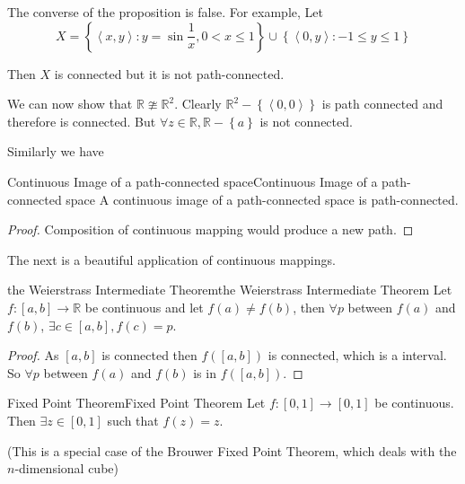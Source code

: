 \documentclass[../main.tex]{subfiles}
\begin{document}
\begin{remark}
The converse of the proposition is false. For example, Let
\begin{equation*}
X = \left\{ \left<x,y\right>: y=\sin \frac{1}{x}, 0<x\leq 1 \right\}\cup \left\{ \left<0,y\right>: -1\leq y\leq 1 \right\}
\end{equation*}

Then $X$ is connected but it is not path-connected.
\end{remark}

We can now show that $\mathbb{R}\ncong \mathbb{R}^2$. Clearly $\mathbb{R}^2 - \left\{ \left<0,0\right> \right\}$ is path connected and therefore is connected. But $\forall z\in \mathbb{R}, \mathbb{R}-\left\{ a \right\}$ is not connected.

Similarly we have
\begin{theorem}{Continuous Image of a path-connected space}{Continuous Image of a path-connected space}
A continuous image of a path-connected space is path-connected.
\end{theorem}
\begin{proof}
Composition of continuous mapping would produce a new path.
\end{proof}

The next is a beautiful application of continuous mappings.
\begin{theorem}{the Weierstrass Intermediate Theorem}{the Weierstrass Intermediate Theorem}
	Let $f:[a,b] \rightarrow \mathbb{R}$ be continuous and let $f(a)\neq f(b)$, then $\forall p$ between $f(a)$ and $f(b)$, $\exists c\in [a,b],f(c)=p$.
\end{theorem}
\begin{proof}
	As $[a,b]$ is connected then $f([a,b])$ is connected, which is a interval. So $\forall p$ between $f(a)$ and $f(b)$ is in $f([a,b])$.
\end{proof}

\begin{corollary}{Fixed Point Theorem}{Fixed Point Theorem}
	Let $f:[0,1]\rightarrow [0,1]$ be continuous. Then $\exists z\in [0,1]$ such that $f(z)=z$.

	(This is a special case of the Brouwer Fixed Point Theorem, which deals with the $n$-dimensional cube)
\end{corollary}
\end{document}
